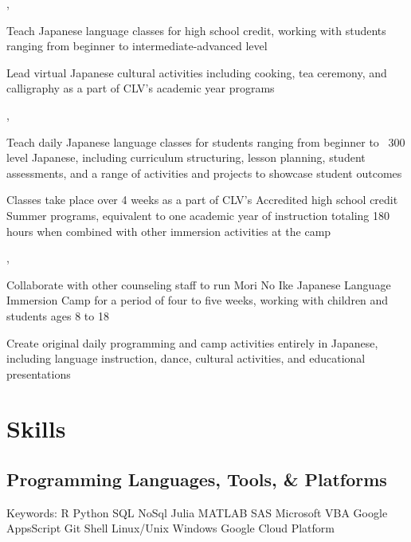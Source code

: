 \documentclass[letterpaper]{deedy-resume_sm}
\begin{document}
, 
\begin{tightitemize}
\item Teach Japanese language classes for high school credit, working with students ranging from beginner to intermediate-advanced level
\item Lead virtual Japanese cultural activities including cooking, tea ceremony, and calligraphy as a part of CLV's academic year programs
\end{tightitemize}
\sectionspace

, 
\begin{tightitemize}
\item Teach daily Japanese language classes for students ranging from beginner to ~300 level Japanese, including curriculum structuring, lesson planning, student assessments, and a range of activities and projects to showcase student outcomes
\item Classes take place over 4 weeks as a part of CLV's Accredited high school credit Summer programs, equivalent to one academic year of instruction totaling 180 hours when combined with other immersion activities at the camp
\end{tightitemize}
\sectionspace

, 
\begin{tightitemize}
\item Collaborate with other counseling staff to run Mori No Ike Japanese Language Immersion Camp for a period of four to five weeks, working with children and students ages 8 to 18
\item Create original daily programming and camp activities entirely in Japanese, including language instruction, dance, cultural activities, and educational presentations
\end{tightitemize}
\sectionspace

\section{Skills}
\subsection{Programming Languages, Tools, \& Platforms}
Keywords: R \textbullet{} Python \textbullet{} SQL \textbullet{} NoSql \textbullet{} Julia \textbullet{} MATLAB \textbullet{} SAS \textbullet{} Microsoft VBA \textbullet{} Google AppsScript \textbullet{} Git \textbullet{} Shell \textbullet{} Linux/Unix \textbullet{} Windows \textbullet{} Google Cloud Platform
\end{document}

